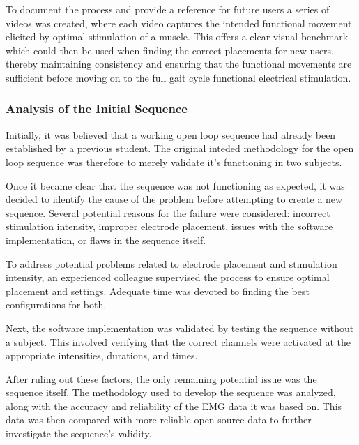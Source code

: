 To document the process and provide a reference for future users a series of videos was created, where each video captures the intended functional movement elicited by optimal stimulation of a muscle. This offers a clear visual benchmark which could then be used when finding the correct placements for new users, thereby maintaining consistency and ensuring that the functional movements are sufficient before moving on to the full gait cycle functional electrical stimulation.

\subsubsection{Analysis of the Initial Sequence}
Initially, it was believed that a working open loop sequence had already been established by a previous student. The original inteded methodology for the open loop sequence was therefore to merely validate it's functioning in two subjects. 

Once it became clear that the sequence was not functioning as expected, it was decided to identify the cause of the problem before attempting to create a new sequence. Several potential reasons for the failure were considered: incorrect stimulation intensity, improper electrode placement, issues with the software implementation, or flaws in the sequence itself.

To address potential problems related to electrode placement and stimulation intensity, an experienced colleague supervised the process to ensure optimal placement and settings. Adequate time was devoted to finding the best configurations for both.

Next, the software implementation was validated by testing the sequence without a subject. This involved verifying that the correct channels were activated at the appropriate intensities, durations, and times.

After ruling out these factors, the only remaining potential issue was the sequence itself. The methodology used to develop the sequence was analyzed, along with the accuracy and reliability of the EMG data it was based on. This data was then compared with more reliable open-source data to further investigate the sequence's validity.


